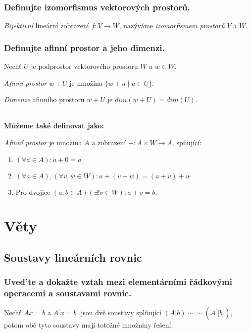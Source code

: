 \documentclass[10pt,a4paper]{article}
\begin{document}
\subsubsection{Definujte izomorfismus vektorových prostorů.}

\textit{Bijektivní} lineární zobrazení $f: V \to W$, nazýváme \textit{izomorfismem prostorů} $V$ a $W$.
 
\subsubsection{Definujte afinní prostor a jeho dimenzi.}

Nechť $U$ je podprostor vektorového prostoru $W$ a $w \in W$. 

\textit{Afinní prostor} $w+U$ je množina $\{w+u\mid u \in U\}$.

\textit{Dimenze} afinního prostoru $w+U$ je $dim(w+U) = dim(U)$.

\textbf{\\Můžeme také definovat jako:}

\textit{Afinní prostor} je množina $A$ a zobrazení $+: A\times W \to A$, spňující:
\begin{enumerate}
    \item $(\forall a \in A): a + 0 = a$
    \item $(\forall a \in A), (\forall v,w \in W): a + (v + w) = (a + v) + w$ 
    \item Pro dvojice $(a, b \in A) (\exists! v \in W): a+v = b$.
\end{enumerate}

\newpage
\section{Věty}
\subsection{Soustavy lineárních rovnic}
\subsubsection{Uved’te a dokažte vztah mezi elementárními řádkovými operacemi a soustavami rovnic.}


Nechť $Ax = b$ a $A^\prime x = b^\prime$ jsou dvě soustavy splňující $(A|b) \sim \sim (A^\prime|b^\prime)$, potom obě tyto soustavy mají totožné množniny řešení.
\end{document}
